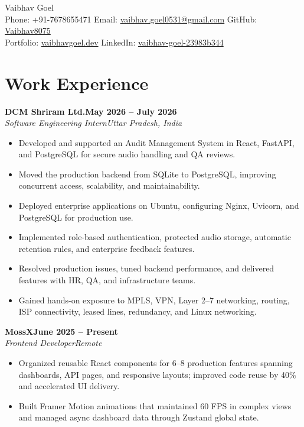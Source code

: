 \documentclass[letterpaper,10pt]{article}
\newcommand{\role}[4]{%
  \textbf{#1}\hfill\textbf{#2}\\
  \textit{#3}\hfill\textit{#4}\par}
\begin{document}
\fontsize{9.5}{10.8}\selectfont

\begin{center}
  {\fontsize{24}{28}\selectfont Vaibhav Goel}\\[3pt]
  Phone: +91-7678655471 \quad
  Email: \href{mailto:vaibhav.goel0531@gmail.com}{vaibhav.goel0531@gmail.com} \quad
  GitHub: \href{https://github.com/Vaibhav8075}{Vaibhav8075}\\
  Portfolio: \href{https://www.vaibhavgoel.dev}{vaibhavgoel.dev} \quad
  LinkedIn: \href{https://www.linkedin.com/in/vaibhav-goel-23983b344}{vaibhav-goel-23983b344}
\end{center}
\vspace{-10pt}

\section{Work Experience}

\role{DCM Shriram Ltd.}{May 2026 -- July 2026}{Software Engineering Intern}{Uttar Pradesh, India}
\begin{itemize}
  \item Developed and supported an Audit Management System in React, FastAPI, and PostgreSQL for secure audio handling and QA reviews.
  \item Moved the production backend from SQLite to PostgreSQL, improving concurrent access, scalability, and maintainability.
  \item Deployed enterprise applications on Ubuntu, configuring Nginx, Uvicorn, and PostgreSQL for production use.
  \item Implemented role-based authentication, protected audio storage, automatic retention rules, and enterprise feedback features.
  \item Resolved production issues, tuned backend performance, and delivered features with HR, QA, and infrastructure teams.
  \item Gained hands-on exposure to MPLS, VPN, Layer 2--7 networking, routing, ISP connectivity, leased lines, redundancy, and Linux networking.
\end{itemize}
\vspace{2pt}

\role{MossX}{June 2025 -- Present}{Frontend Developer}{Remote}
\begin{itemize}
  \item Organized reusable React components for 6--8 production features spanning dashboards, API pages, and responsive layouts; improved code reuse by 40\% and accelerated UI delivery.
  \item Built Framer Motion animations that maintained 60 FPS in complex views and managed async dashboard data through Zustand global state.
\end{itemize}
\vspace{2pt}
\end{document}
